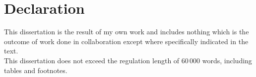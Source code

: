 
\chapter*{Declaration}

\begin{list}{}{%
  \setlength{\leftmargin}{2cm}%
  \setlength{\rightmargin}{2cm}%
}\item[]
This dissertation is the result of my own work and includes nothing which is the outcome of work done in collaboration except where specifically indicated in the text.
\\

This dissertation does not exceed the regulation length of 60\,000 words, including tables and footnotes.
\end{list}

